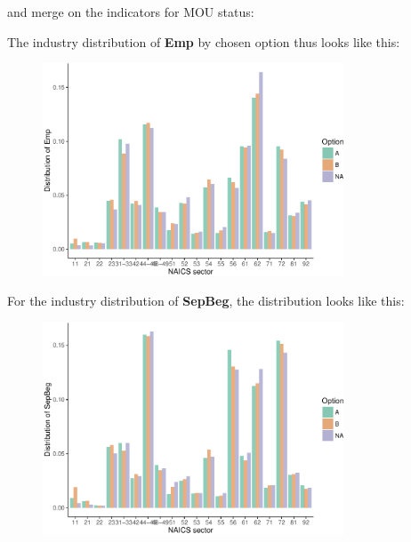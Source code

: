 \documentclass[]{article}
\newenvironment{Shaded}{\begin{snugshade}}{\end{snugshade}}
\newcommand{\KeywordTok}[1]{\textcolor[rgb]{0.13,0.29,0.53}{\textbf{{#1}}}}
\newcommand{\DataTypeTok}[1]{\textcolor[rgb]{0.13,0.29,0.53}{{#1}}}
\newcommand{\StringTok}[1]{\textcolor[rgb]{0.31,0.60,0.02}{{#1}}}
\newcommand{\OtherTok}[1]{\textcolor[rgb]{0.56,0.35,0.01}{{#1}}}
\newcommand{\NormalTok}[1]{{#1}}
\begin{document}
and merge on the indicators for MOU status:

\begin{Shaded}
\end{Shaded}

The industry distribution of \textbf{Emp} by chosen option thus looks
like this:
\begin{figure}
\centering
\includegraphics[width=0.8\textwidth]{s2014_availability_files/figure-latex/graph_Emp-1.pdf}
\end{figure}

For the industry distribution of \textbf{SepBeg}, the distribution looks
like this:
\begin{figure}
\centering
\includegraphics[width=0.8\textwidth]{s2014_availability_files/figure-latex/graph_SepBeg-1.pdf}
\end{figure}
\end{document}
